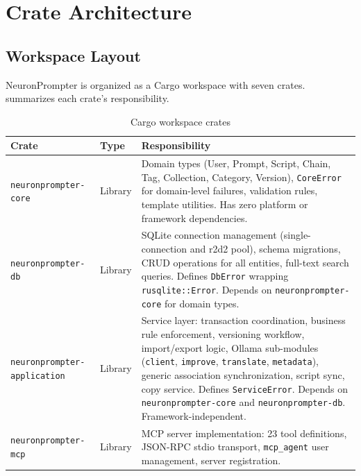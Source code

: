 \documentclass[a4paper, 11pt, oneside]{report}
\begin{document}
\chapter{Crate Architecture}
\label{ch:crates}

\section{Workspace Layout}
\label{sec:workspace}

NeuronPrompter is organized as a Cargo workspace with seven crates.
 summarizes each crate's responsibility.

\begin{table}[H]
  \centering
  \caption{Cargo workspace crates}
  \label{tab:crate-overview}
  \begin{tabularx}{\textwidth}{l l X}
    \toprule
    \textbf{Crate} & \textbf{Type} & \textbf{Responsibility} \\
    \midrule
    \texttt{neuronprompter-core} & Library &
      Domain types (User, Prompt, Script, Chain, Tag, Collection,
      Category, Version), \texttt{CoreError} for
      domain-level failures, validation rules, template utilities.
      Has zero platform or framework dependencies. \\
    \texttt{neuronprompter-db}   & Library &
      SQLite connection management (single-connection and r2d2
      pool), schema migrations, CRUD operations for all entities,
      full-text search queries.
      Defines \texttt{DbError} wrapping \texttt{rusqlite::Error}.
      Depends on \texttt{neuronprompter-core} for domain types. \\
    \texttt{neuronprompter-application} & Library &
      Service layer: transaction coordination, business rule
      enforcement, versioning workflow, import/export logic,
      Ollama sub-modules (\texttt{client}, \texttt{improve},
      \texttt{translate}, \texttt{metadata}), generic association
      synchronization, script sync, copy service.
      Defines \texttt{ServiceError}.
      Depends on \texttt{neuronprompter-core} and
      \texttt{neuronprompter-db}.  Framework-independent. \\
    \texttt{neuronprompter-mcp}  & Library &
      MCP server implementation: 23 tool definitions, JSON-RPC
      stdio transport, \texttt{mcp\_agent} user management,
      server registration.

\end{tabularx}
\end{table}
\end{document}
